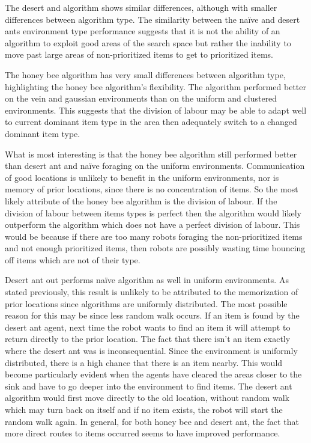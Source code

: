 The desert and algorithm shows similar differences, although with smaller differences between algorithm type. The similarity between the na\"ive and desert ants environment type performance suggests that it is not the ability of an algorithm to exploit good areas of the search space but rather the inability to move past large areas of non-prioritized items to get to prioritized items.

The honey bee algorithm has very small differences between algorithm type, highlighting the honey bee algorithm's flexibility. The algorithm performed better on the vein and gaussian environments than on the uniform and clustered environments. This suggests that the division of labour may be able to adapt well to current dominant item type in the area then adequately switch to a changed dominant item type.

What is most interesting is that the honey bee algorithm still performed better than desert ant and na\"ive foraging on the uniform environments. Communication of good locations is unlikely to benefit in the uniform environments, nor is memory of prior locations, since there is no concentration of items. So the most likely attribute of the honey bee algorithm is the division of labour. If the division of labour between items types is perfect then the algorithm would likely outperform the algorithm which does not have a perfect division of labour. This would be because if there are too many robots foraging the non-prioritized items and not enough prioritized items, then robots are possibly wasting time bouncing off items which are not of their type. %

Desert ant out performs na\"ive algorithm as well in uniform environments. As stated previously, this result is unlikely to be attributed to the memorization of prior locations since algorithms are uniformly distributed. The most possible reason for this may be since less random walk occurs. If an item is found by the desert ant agent, next time the robot wants to find an item it will attempt to return directly to the prior location. The fact that there isn't an item exactly where the desert ant was is inconsequential. Since the environment is uniformly distributed, there is a high chance that there is an item nearby. This would become particularly evident when the agents have cleared the areas closer to the sink and have to go deeper into the environment to find items. The desert ant algorithm would first move directly to the old location, without random walk which may turn back on itself and if no item exists, the robot will start the random walk again. In general, for both honey bee and desert ant, the fact that more direct routes to items occurred seems to have improved performance. 

